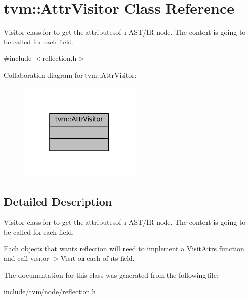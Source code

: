 \hypertarget{classtvm_1_1AttrVisitor}{}\section{tvm\+:\+:Attr\+Visitor Class Reference}
\label{classtvm_1_1AttrVisitor}


Visitor class for to get the attributesof a A\+S\+T/\+IR node. The content is going to be called for each field.  




{\ttfamily \#include $<$reflection.\+h$>$}



Collaboration diagram for tvm\+:\+:Attr\+Visitor\+:
\nopagebreak
\begin{figure}[H]
\begin{center}
\leavevmode
\includegraphics[width=169pt]{classtvm_1_1AttrVisitor__coll__graph}
\end{center}
\end{figure}


\subsection{Detailed Description}
Visitor class for to get the attributesof a A\+S\+T/\+IR node. The content is going to be called for each field. 

Each objects that wants reflection will need to implement a Visit\+Attrs function and call visitor-\/$>$Visit on each of its field. 

The documentation for this class was generated from the following file\+:\begin{DoxyCompactItemize}
\item 
include/tvm/node/\hyperlink{reflection_8h}{reflection.\+h}\end{DoxyCompactItemize}
